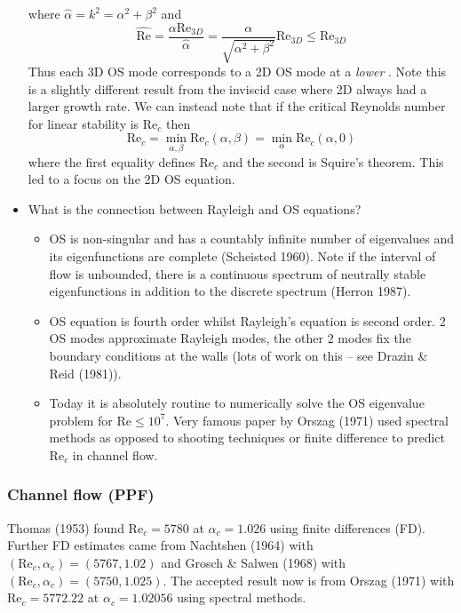 \documentclass{jknotes}
\newcommand{\ReN}{\text{Re}}
\begin{document}
\begin{itemize}
		where $\hat{\alpha} = k^2 = \alpha^2 + \beta^2$ and
		\begin{equation}
			\hat{\ReN} = \frac{\alpha \ReN_{3D}}{\hat{\alpha}} =
			\frac{\alpha}{\sqrt{\alpha^2 + \beta^2}}\ReN_{3D} \le \ReN_{3D}
		\end{equation}
		Thus each 3D OS mode corresponds to a 2D OS mode at a \emph{lower}
		\ReN. Note this is a slightly different result from the inviscid case
		where 2D always had a larger growth rate. We can instead note that if
		the critical Reynolds number for linear stability is $\ReN_c$ then
		\begin{equation}
			\ReN_c = \min_{\alpha,\beta} \ReN_c(\alpha,\beta) = \min_{\alpha}
			\ReN_c(\alpha,0)
		\end{equation}
		where the first equality defines $\ReN_c$ and the second is Squire's
		theorem. This led to a focus on the 2D OS equation.
	\item What is the connection between Rayleigh and OS equations? 
		\begin{itemize}
			\item OS is non-singular and has a countably infinite number of
				eigenvalues and its eigenfunctions are complete (Scheisted
				1960). Note if the interval of flow is unbounded, there is a
				continuous spectrum of neutrally stable eigenfunctions in
				addition to the discrete spectrum (Herron 1987). 
			\item OS equation is fourth order whilst Rayleigh's equation is
				second order. 2 OS modes approximate Rayleigh modes, the other
				2 modes fix the boundary conditions at the walls (lots of work
				on this -- see Drazin \& Reid (1981)).
			\item Today it is absolutely routine to numerically solve the OS
				eigenvalue problem for $\ReN \le 10^7$. Very famous paper by
				Orszag (1971) used spectral methods as opposed to shooting
				techniques or finite difference to predict $\ReN_c$ in channel
				flow.
		\end{itemize}
\end{itemize}

\subsubsection{Channel flow (PPF)}
Thomas (1953) found $\ReN_c = 5780$ at $\alpha_c = 1.026$ using finite
differences (FD). Further FD estimates came from Nachtshen (1964) with
$(\ReN_c, \alpha_c) = (5767,1.02)$ and Grosch \& Salwen (1968) with $(\ReN_c,
\alpha_c) = (5750, 1.025)$. The accepted result now is from Orszag (1971) with
$\ReN_c = 5772.22$ at $\alpha_c = 1.02056$ using spectral methods.
\end{document}
